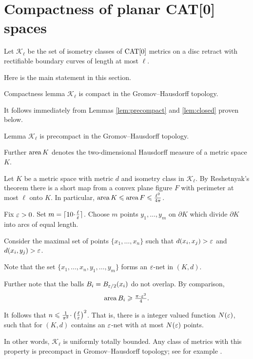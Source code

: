 \documentclass{article}
\begin{document}
\section{Compactness of planar CAT[0] spaces}\label{Compactness}

Let $\mathcal{K}_\ell$ be the set of isometry classes of $\mathop{\rm CAT}\nolimits[0]$ metrics on a disc retract with rectifiable
boundary curves of length at most $\ell$.


Here is the main statement in this section.

\begin{thm}{Compactness lemma}\label{lem:compact}
$\mathcal{K}_\ell$ is compact in the Gromov--Hausdorff topology.
\end{thm}

It follows immediately from Lemmas \ref{lem:precompact} and \ref{lem:closed} proven below.

\begin{thm}{Lemma}\label{lem:precompact}
$\mathcal{K}_\ell$ is precompact in the Gromov--Hausdorff topology.
\end{thm}

Further $\mathop{\rm area}\nolimits K$ denotes the two-dimensional Hausdorff measure of a metric space $K$. 

Let $K$ be a metric space with metric $d$ and isometry class in $\mathcal {K}_\ell$.
By Reshetnyak's theorem there is a short map from a convex plane figure $F$ with perimeter at most $\ell$ onto $K$.
In particular, $\mathop{\rm area}\nolimits K \leqslant \mathop{\rm area}\nolimits F \leqslant \tfrac{\ell^2}{4\pi}$.

Fix $\varepsilon>0$. 
Set $m=\lceil 10\cdot\tfrac\ell\eps\rceil$.
Choose $m$ points $y_1,\dots,y_m$ on $\partial K$
which divide $\partial K$ into arcs of equal length.

Consider the maximal set of points $\{x_1,\dots,x_n\}$ such that $d(x_i,x_j)>\varepsilon$ and $d(x_i,y_j)>\varepsilon$.

Note that the set $\{x_1,\dots,x_n,y_1,\dots,y_m\}$
forms an $\varepsilon$-net in $(K,d)$.

Further note that the balls $B_i=B_{\varepsilon/2}(x_i)$
do not overlap.
By comparison,
\[\area B_i\ge \tfrac{\pi\cdot\eps^2}{4}.\]

It follows that $n\le \tfrac{1}{\pi^2}\cdot\left(\tfrac\ell\eps\right)^2$.
That is, there is a integer valued function $N(\varepsilon)$,
such that for  
$(K,d)$ contains an $\varepsilon$-net
with at most $N(\varepsilon)$ points.

In other words, $\mathcal{K}_\ell$ is uniformly totally bounded.
Any class of metrics with this property is precompact in Gromov--Hausdorff topology; 
see for example \cite[7.4.15]{BBI}.
\qeds
\end{document}
